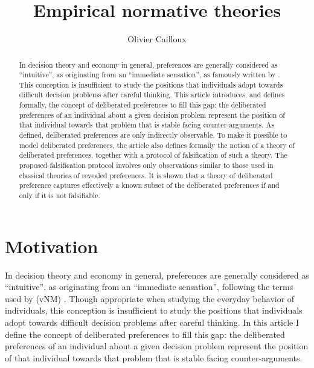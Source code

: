 \documentclass[version=last, pagesize, twoside=off, bibliography=totoc, DIV=calc, fontsize=12pt, a4paper, french, english]{scrartcl}
\begin{document}
\title{Empirical normative theories}
\author{Olivier Cailloux}
\makeatletter
\makeatother
\maketitle

\begin{abstract}
	In decision theory and economy in general, preferences are generally considered as “intuitive”, as originating from an “immediate sensation”, as famously written by \citeauthor{von_neumann_theory_2004}. This conception is insufficient to study the positions that individuals adopt towards difficult decision problems after careful thinking. This article introduces, and defines formally, the concept of deliberated preferences to fill this gap: the deliberated preferences of an individual about a given decision problem represent the position of that individual towards that problem that is stable facing counter-arguments. As defined, deliberated preferences are only indirectly observable. To make it possible to model deliberated preferences, the article also defines formally the notion of a theory of deliberated preferences, together with a protocol of falsification of such a theory. The proposed falsification protocol involves only observations similar to those used in classical theories of revealed preferences. It is shown that a theory of deliberated preference captures effectively a known subset of the deliberated preferences if and only if it is not falsifiable.
\end{abstract}

\section{Motivation}
In decision theory and economy in general, preferences are generally considered as “intuitive”, as originating from an “immediate sensation”, following the terms used by \citet{von_neumann_theory_2004} (vNM) \citep{fishburn_retrospective_1989, cailloux_reasons_2017}. Though appropriate when studying the everyday behavior of individuals, this conception is insufficient to study the positions that individuals adopt towards difficult decision problems after careful thinking. In this article I define the concept of deliberated preferences to fill this gap: the deliberated preferences of an individual about a given decision problem represent the position of that individual towards that problem that is stable facing counter-arguments. 
\end{document}
